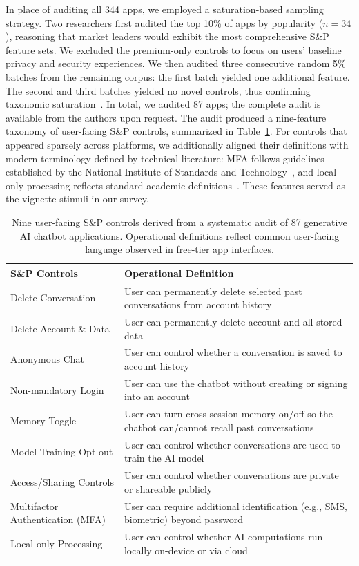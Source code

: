 \documentclass[letterpaper,twocolumn,10pt]{article}
\begin{document}
 In place of auditing all 344 apps, we employed a saturation-based sampling strategy. Two researchers first audited the top 10\% of apps by popularity ($n=34$), reasoning that market leaders would exhibit the most comprehensive S\&P feature sets. We excluded the premium-only controls to focus on users' baseline privacy and security experiences. We then audited three consecutive random 5\% batches from the remaining corpus: the first batch yielded one additional feature. The second and third batches yielded no novel controls, thus confirming taxonomic saturation~\cite{guest2020simple}. In total, we audited 87 apps; the complete audit is available from the authors upon request. The audit produced a nine-feature taxonomy of user-facing S\&P controls, summarized in Table~\ref{tab:taxonomy}. For controls that appeared sparsely across platforms, we additionally aligned their definitions with modern terminology defined by technical literature: MFA follows guidelines established by the National Institute of Standards and Technology~\cite{nist80063b4}, and local-only processing reflects standard academic definitions~\cite{zhou2019edge, xu2024device}. These features served as the vignette stimuli in our survey.

\begin{table}[t]
\centering

\small
\begin{tabular}{@{}ll@{}}
\toprule
\textbf{S\&P Controls} & \textbf{Operational Definition} \\
\midrule
Delete Conversation & User can permanently delete selected past conversations from account history \\
Delete Account \& Data & User can permanently delete account and all stored data \\
Anonymous Chat & User can control whether a conversation is saved to account history \\
Non-mandatory Login & User can use the chatbot without creating or signing into an account \\
Memory Toggle & User can turn cross-session memory on/off so the chatbot can/cannot recall past conversations \\
Model Training Opt-out & User can control whether conversations are used to train the AI model \\
Access/Sharing Controls & User can control whether conversations are private or shareable publicly \\
Multifactor Authentication (MFA) & User can require additional identification (e.g., SMS, biometric) beyond password \\
Local-only Processing & User can control whether AI computations run locally on-device or via cloud \\
\bottomrule
\end{tabular}
\caption{Nine user-facing S\&P controls derived from a systematic audit of 87 generative AI chatbot applications. Operational definitions reflect common user-facing language observed in free-tier app interfaces.}
\label{tab:taxonomy}
\end{table}
\end{document}
